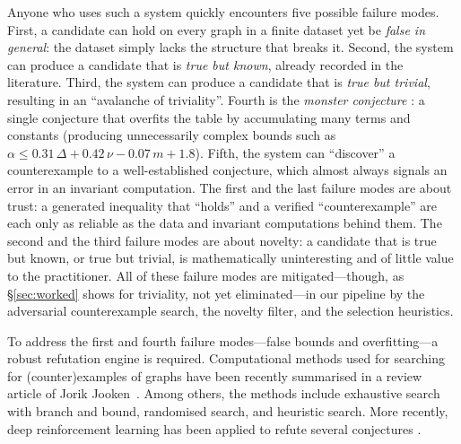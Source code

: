 \documentclass[]{ceurart}
\begin{document}
Anyone who uses such a system quickly encounters five possible failure modes.
First, a candidate can hold on every graph in a finite dataset yet be
\emph{false in general}: the dataset simply lacks the structure that breaks
it. Second, the system can produce a candidate that is \emph{true but known}, already recorded in the literature. Third, the system can produce a candidate that is \emph{true but trivial}, resulting in an ``avalanche of triviality''. Fourth is the \emph{monster conjecture} \cite{davila2026graffiti3}: a single
conjecture that overfits the table by accumulating many terms and constants
(producing unnecessarily complex bounds such as $\alpha\le 0.31\,\Delta+0.42\,\nu-0.07\,m+1.8$).
Fifth, the system can ``discover'' a counterexample
to a well-established conjecture, which almost always signals an error in an
invariant computation. The first and the last failure
modes are about trust: a generated inequality that ``holds'' and a
verified ``counterexample'' are each only as reliable as the data and invariant computations behind them. The second and the third failure modes are about novelty: a candidate that is true but known, or true but trivial, is mathematically uninteresting and of little value to the practitioner. All of these failure modes are mitigated---though, as \S\ref{sec:worked} shows for triviality, not yet eliminated---in our pipeline by the adversarial counterexample search, the novelty filter, and the selection heuristics.

To address the first and fourth failure modes---false bounds and overfitting---a robust refutation engine is required. Computational methods used for searching for (counter)examples of graphs have been recently summarised in a review article of Jorik Jooken~\cite{jooken2025computer}. Among others, the methods include exhaustive search with branch and bound, randomised search, and heuristic search. More recently, deep reinforcement learning has been applied to refute several conjectures \cite{wagner2021constructions}.
\end{document}
